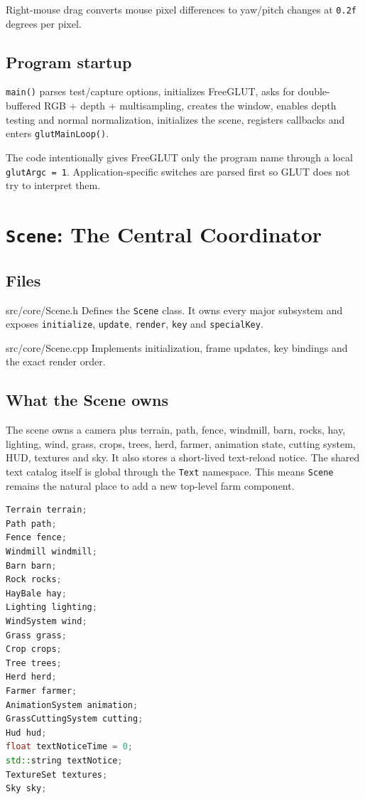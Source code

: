 \documentclass[11pt,a4paper,openany]{book}
\newcommand{\code}[1]{\texttt{#1}}
\begin{document}
Right-mouse drag converts mouse pixel differences to yaw/pitch changes at \code{0.2f} degrees per pixel.

\section{Program startup}
\code{main()} parses test/capture options, initializes FreeGLUT, asks for double-buffered RGB + depth + multisampling, creates the window, enables depth testing and normal normalization, initializes the scene, registers callbacks and enters \code{glutMainLoop()}.

\begin{warningbox}
	The code intentionally gives FreeGLUT only the program name through a local \code{glutArgc = 1}. Application-specific switches are parsed first so GLUT does not try to interpret them.
\end{warningbox}

\chapter{\texttt{Scene}: The Central Coordinator}
\section{Files}
\begin{filebox}{src/core/Scene.h}
	Defines the \code{Scene} class. It owns every major subsystem and exposes \code{initialize}, \code{update}, \code{render}, \code{key} and \code{specialKey}.
\end{filebox}
\begin{filebox}{src/core/Scene.cpp}
	Implements initialization, frame updates, key bindings and the exact render order.
\end{filebox}

\section{What the Scene owns}
The scene owns a camera plus terrain, path, fence, windmill, barn, rocks, hay, lighting, wind, grass, crops, trees, herd, farmer, animation state, cutting system, HUD, textures and sky. It also stores a short-lived text-reload notice. The shared text catalog itself is global through the \code{Text} namespace. This means \code{Scene} remains the natural place to add a new top-level farm component.

\begin{lstlisting}[language=C++]
Terrain terrain;
Path path;
Fence fence;
Windmill windmill;
Barn barn;
Rock rocks;
HayBale hay;
Lighting lighting;
WindSystem wind;
Grass grass;
Crop crops;
Tree trees;
Herd herd;
Farmer farmer;
AnimationSystem animation;
GrassCuttingSystem cutting;
Hud hud;
float textNoticeTime = 0;
std::string textNotice;
TextureSet textures;
Sky sky;
\end{lstlisting}
\end{document}
